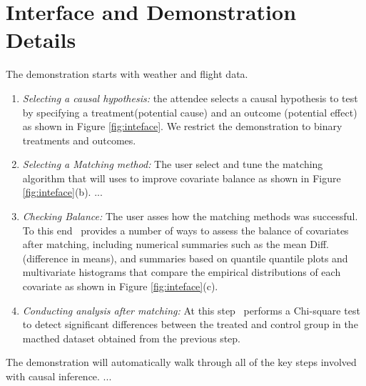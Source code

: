 \section{Interface and Demonstration Details}
\label{sec:dd}



The demonstration starts with weather and flight data.

\begin{enumerate}
\item {\it Selecting a causal hypothesis:} the attendee selects a causal hypothesis to test by
specifying a treatment(potential cause) and an outcome (potential effect) as shown in Figure \ref{fig:inteface}. We restrict the demonstration to binary treatments and outcomes.

\item {\it Selecting a Matching method:} The user select and tune the matching algorithm that \GSQL will uses to improve covariate balance as shown in Figure \ref{fig:inteface}(b). ...

\item {\it Checking Balance:} The user asses how the matching methods was successful. To this end \GSQL \ provides a number of ways to assess the balance of covariates after matching, including numerical summaries such as the mean Diff. (difference in means), and summaries based on quantile quantile plots and multivariate histograms that compare the empirical distributions of each covariate as shown in Figure \ref{fig:inteface}(c). 
     
\item {\it Conducting analysis after matching:}  At this step \GSQL\  performs a Chi-square test to detect significant differences between the treated and control group in the macthed dataset obtained from the previous step.



\end{enumerate}


The demonstration will automatically walk through all of the key steps involved with causal inference.  ... 

